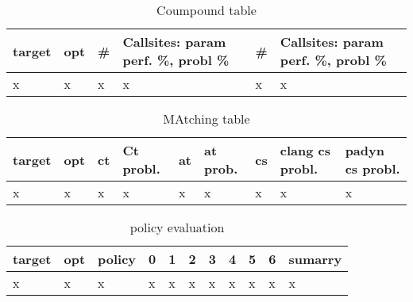 \begin{table}[H]
\centering
\caption{Coumpound table}
\label{Integer overflow bug detection in CWE-190}
\begin{tabular}{|l|l|l|l|l|l|} \hline
\textbf{target}  & \textbf{opt}     & \textbf{\#}    &\textbf{Callsites: param perf. \%, probl \%} & \textbf{\#}  & \textbf{Callsites: param perf. \%, probl \%}  \\ \hline 
x                &x                 &x               &x                                      &x             &x                                        \\ \hline

\end{tabular}
\end{table}


\begin{table}[H]
\centering
\caption{MAtching table}
\label{Integer overflow bug detection in CWE-190}
\begin{tabular}{|l|l|l|l|l|l|l|l|l|} \hline
\textbf{target}  & \textbf{opt}     & \textbf{ct}    &\textbf{Ct probl.} & \textbf{at}  & \textbf{at prob.} &\textbf{cs} & \textbf{clang cs probl.}  & \textbf{padyn cs probl.}  \\ \hline 
x                &x                 &x               &x                  &x             &x                  &x           &x                          &x   \\ \hline

\end{tabular}
\end{table}


\begin{table}[H]
\centering
\caption{policy evaluation}
\label{Integer overflow bug detection in CWE-190}
\begin{tabular}{|l|l|l|l|l|l|l|l|l|l|l|} \hline
\textbf{target}  & \textbf{opt}     & \textbf{policy}    &\textbf{0} & \textbf{1}  & \textbf{2} &\textbf{3} & \textbf{4}  & \textbf{5} & \textbf{6}  & \textbf{sumarry}  \\ \hline 
x                &x                 &x                   &x          &x            &x           &x          &x            &x           &x            &x \\ \hline

\end{tabular}
\end{table}

